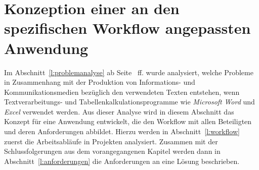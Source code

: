 \section{Konzeption einer an den spezifischen Workflow angepassten Anwendung}

Im Abschnitt~\ref{l:problemanalyse} ab Seite~\pageref{l:problemanalyse} ff. wurde analysiert, welche Probleme in Zusammenhang mit der Produktion von Informations- und Kommunikationsmedien bezüglich den verwendeten Texten entstehen, wenn Textverarbeitungs- und Tabellenkalkulationsprogramme wie \emph{Microsoft} \emph{Word} und \emph{Excel} verwendet werden. Aus dieser Analyse wird in diesem Abschnitt das Konzept für eine Anwendung entwickelt, die den Workflow mit allen Beteiligten und deren Anforderungen abbildet. Hierzu werden in Abschnitt~\ref{l:workflow} zuerst die Arbeitsabläufe in Projekten analysiert. Zusammen mit der Schlussfolgerungen aus dem vorangegangenen Kapitel werden dann in Abschnitt~\ref{l:anforderungen} die Anforderungen an eine Lösung beschrieben. 







